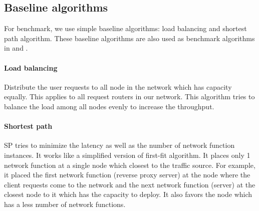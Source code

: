 \documentclass[conference]{IEEEtran}
\begin{document}
\subsection{Baseline algorithms}
For benchmark, we use simple baseline algorithms: load balancing and shortest path algorithm. These baseline algorithms are also used as benchmark algorithms in \cite{8485853} and \cite{9269087}. 

\paragraph{Load balancing} Distribute the user requests to all node in the network which has capacity equally. This applies to all request routers in our network. This algorithm tries to balance the load among all nodes evenly to increase the throughput. 

\paragraph{Shortest path} SP tries to minimize the latency as well as the number of network function instances. It works like a simplified version of first-fit algorithm. It places only 1 network function at a single node which closest to the traffic source. For example, it placed the first network function (reverse proxy server) at the node where the client requests come to the network and the next network function (server) at the closest node to it which has the capacity to deploy. It also favors the node which has a less number of network functions. 
\end{document}
